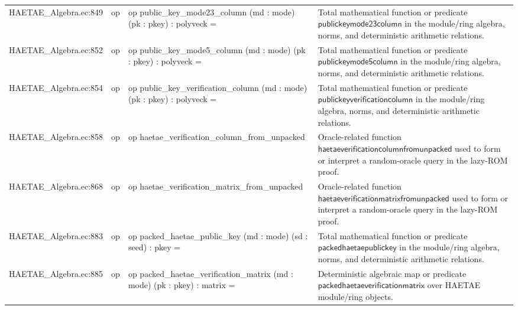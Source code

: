 \documentclass[10pt]{article}
\begin{document}
\begin{longtable}{L{0.11\textwidth}L{0.055\textwidth}L{0.385\textwidth}L{0.41\textwidth}}
HAETAE\_\allowbreak{}Algebra.\allowbreak{}ec:\allowbreak{}849 & op & {\ttfamily\scriptsize op public\_\allowbreak{}key\_\allowbreak{}mode23\_\allowbreak{}column (md : mode) (pk : pkey) : polyveck =} & Total mathematical function or predicate $\mathsf{publickeymode23column}$ in the module/ring algebra, norms, and deterministic arithmetic relations. \\
HAETAE\_\allowbreak{}Algebra.\allowbreak{}ec:\allowbreak{}852 & op & {\ttfamily\scriptsize op public\_\allowbreak{}key\_\allowbreak{}mode5\_\allowbreak{}column (md : mode) (pk : pkey) : polyveck =} & Total mathematical function or predicate $\mathsf{publickeymode5column}$ in the module/ring algebra, norms, and deterministic arithmetic relations. \\
HAETAE\_\allowbreak{}Algebra.\allowbreak{}ec:\allowbreak{}854 & op & {\ttfamily\scriptsize op public\_\allowbreak{}key\_\allowbreak{}verification\_\allowbreak{}column (md : mode) (pk : pkey) : polyveck =} & Total mathematical function or predicate $\mathsf{publickeyverificationcolumn}$ in the module/ring algebra, norms, and deterministic arithmetic relations. \\
HAETAE\_\allowbreak{}Algebra.\allowbreak{}ec:\allowbreak{}858 & op & {\ttfamily\scriptsize op haetae\_\allowbreak{}verification\_\allowbreak{}column\_\allowbreak{}from\_\allowbreak{}unpacked} & Oracle-related function $\mathsf{haetaeverificationcolumnfromunpacked}$ used to form or interpret a random-oracle query in the lazy-ROM proof. \\
HAETAE\_\allowbreak{}Algebra.\allowbreak{}ec:\allowbreak{}868 & op & {\ttfamily\scriptsize op haetae\_\allowbreak{}verification\_\allowbreak{}matrix\_\allowbreak{}from\_\allowbreak{}unpacked} & Oracle-related function $\mathsf{haetaeverificationmatrixfromunpacked}$ used to form or interpret a random-oracle query in the lazy-ROM proof. \\
HAETAE\_\allowbreak{}Algebra.\allowbreak{}ec:\allowbreak{}883 & op & {\ttfamily\scriptsize op packed\_\allowbreak{}haetae\_\allowbreak{}public\_\allowbreak{}key (md : mode) (sd : seed) : pkey =} & Total mathematical function or predicate $\mathsf{packedhaetaepublickey}$ in the module/ring algebra, norms, and deterministic arithmetic relations. \\
HAETAE\_\allowbreak{}Algebra.\allowbreak{}ec:\allowbreak{}885 & op & {\ttfamily\scriptsize op packed\_\allowbreak{}haetae\_\allowbreak{}verification\_\allowbreak{}matrix (md : mode) (pk : pkey) : matrix =} & Deterministic algebraic map or predicate $\mathsf{packedhaetaeverificationmatrix}$ over HAETAE module/ring objects. \\

\end{longtable}
\end{document}
